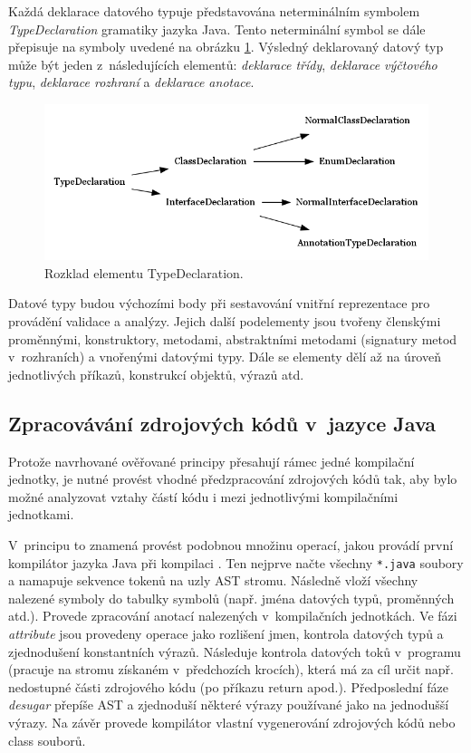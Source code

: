 Každá deklarace datového typuje představována neterminálním symbolem \emph{TypeDeclaration} gramatiky jazyka Java. Tento neterminální symbol se dále přepisuje na symboly uvedené na obrázku \ref{type_declaration_options}. Výsledný deklarovaný datový typ může být jeden z~následujících elementů: \emph{deklarace třídy}, \emph{deklarace výčtového typu}, \emph{deklarace rozhraní} a \emph{deklarace anotace}.

\begin{figure}[h!]
  \centering
  \includegraphics[width=\textwidth]{./graphs/toplevel_types.png}
  \caption{Rozklad elementu TypeDeclaration.\label{type_declaration_options}}
\end{figure}

Datové typy budou výchozími body při sestavování vnitřní reprezentace pro provádění validace a analýzy. Jejich další podelementy jsou tvořeny členskými proměnnými, konstruktory, metodami, abstraktními metodami (signatury metod v~rozhraních) a vnořenými datovými typy. Dále se elementy dělí až na úroveň jednotlivých příkazů, konstrukcí objektů, výrazů atd.

\subsection{Zpracovávání zdrojových kódů v~jazyce Java}
\label{analysis-java_source_processing}
Protože navrhované ověřované principy přesahují rámec jedné kompilační jednotky, je nutné provést vhodné předzpracování zdrojových kódů tak, aby bylo možné analyzovat vztahy částí kódu i mezi jednotlivými kompilačními jednotkami.

V~principu to znamená provést podobnou množinu operací, jakou provádí první kompilátor jazyka Java při kompilaci \cite{hackers_guide_to_javac}. Ten nejprve načte všechny \verb+*.java+ soubory a namapuje sekvence tokenů na uzly AST stromu. Následně vloží všechny nalezené symboly do tabulky symbolů (např. jména datových typů, proměnných atd.). Provede zpracování anotací nalezených v~kompilačních jednotkách. Ve fázi \emph{attribute} jsou provedeny operace jako rozlišení jmen, kontrola datových typů a zjednodušení konstantních výrazů. Následuje kontrola datových toků v~programu (pracuje na stromu získaném v~předchozích krocích), která má za cíl určit např. nedostupné části zdrojového kódu (po příkazu return apod.). Předposlední fáze \emph{desugar} přepíše AST a zjednoduší některé výrazy používané jako  na jednodušší výrazy. Na závěr provede kompilátor vlastní vygenerování zdrojových kódů nebo class souborů.

